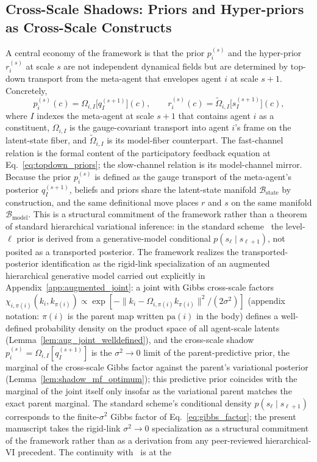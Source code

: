 \documentclass[11pt]{article}
\begin{document}
\subsection{Cross-Scale Shadows: Priors and Hyper-priors as Cross-Scale Constructs}
\label{sec:cross_scale_shadows}

A central economy of the framework is that the prior $p_i^{(s)}$ and the hyper-prior $r_i^{(s)}$ at scale $s$ are not independent dynamical fields but are determined by top-down transport from the meta-agent that envelopes agent $i$ at scale $s+1$. Concretely,
\begin{equation}
p_i^{(s)}(c) = \Omega_{i,I}\big[q_I^{(s+1)}\big](c),
\qquad
r_i^{(s)}(c) = \tilde\Omega_{i,I}\big[s_I^{(s+1)}\big](c),
\label{eq:cross_scale_shadow}
\end{equation}
where $I$ indexes the meta-agent at scale $s+1$ that contains agent $i$ as a constituent, $\Omega_{i,I}$ is the gauge-covariant transport into agent $i$'s frame on the latent-state fiber, and $\tilde\Omega_{i,I}$ is its model-fiber counterpart. The fast-channel relation is the formal content of the participatory feedback equation at Eq.~\eqref{eq:topdown_priors}; the slow-channel relation is its model-channel mirror. Because the prior $p_i^{(s)}$ is defined as the gauge transport of the meta-agent's posterior $q_I^{(s+1)}$, beliefs and priors share the latent-state manifold $\mathcal{B}_{\mathrm{state}}$ by construction, and the same definitional move places $r$ and $s$ on the same manifold $\mathcal{B}_{\mathrm{model}}$. This is a structural commitment of the framework rather than a theorem of standard hierarchical variational inference: in the standard scheme~\cite{Friston2017, parr2022active} the level-$\ell$ prior is derived from a generative-model conditional $p(s_\ell \mid s_{\ell+1})$, not posited as a transported posterior. The framework realizes the transported-posterior identification as the rigid-link specialization of an augmented hierarchical generative model carried out explicitly in Appendix~\ref{app:augmented_joint}: a joint with Gibbs cross-scale factors $\chi_{i,\pi(i)}(k_i, k_{\pi(i)}) \propto \exp[-\|k_i - \Omega_{i,\pi(i)}k_{\pi(i)}\|^2/(2\sigma^2)]$ (appendix notation: $\pi(i)$ is the parent map written $\mathrm{pa}(i)$ in the body) defines a well-defined probability density on the product space of all agent-scale latents (Lemma~\ref{lem:aug_joint_welldefined}), and the cross-scale shadow $p_i^{(s)} = \Omega_{i,I}[q_I^{(s+1)}]$ is the $\sigma^2 \to 0$ limit of the parent-predictive prior, the marginal of the cross-scale Gibbs factor against the parent's variational posterior (Lemma~\ref{lem:shadow_mf_optimum}); this predictive prior coincides with the marginal of the joint itself only insofar as the variational parent matches the exact parent marginal. The standard scheme's conditional density $p(s_\ell \mid s_{\ell+1})$ corresponds to the finite-$\sigma^2$ Gibbs factor of Eq.~\eqref{eq:gibbs_factor}; the present manuscript takes the rigid-link $\sigma^2 \to 0$ specialization as a structural commitment of the framework rather than as a derivation from any peer-reviewed hierarchical-VI precedent. The continuity with~\cite{Friston2010, Friston2017, parr2022active} is at the 
\end{document}
